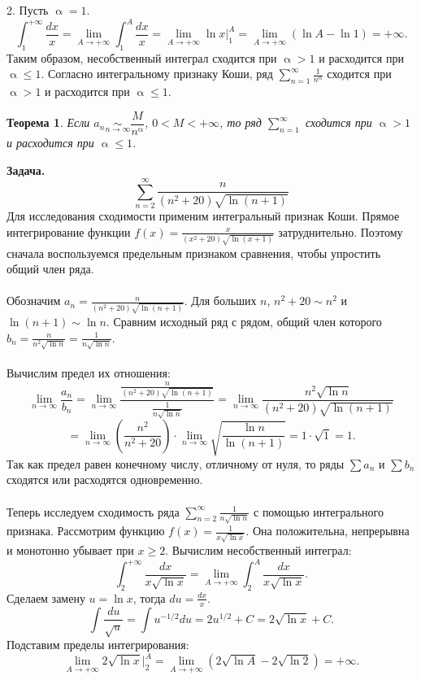 \documentclass[a4paper, 12pt]{report}
\numberwithin{equation}{section}
\renewcommand{\leq}{\leqslant}
\renewcommand{\alpha}{\upalpha}
\newcommand{\sumn}{\sum\limits_{n=1}^\infty}
\newtheorem*{theorem}{Теорема}
\begin{document}
	2. Пусть $\alpha = 1$.
	$$ \int_{1}^{+\infty} \frac{dx}{x} = \lim_{A \to +\infty} \int_{1}^{A} \frac{dx}{x} = \lim_{A \to +\infty} \ln x\Big|_{1}^{A} = \lim_{A \to +\infty} (\ln A - \ln 1) = +\infty. $$
	Таким образом, несобственный интеграл сходится при $\alpha > 1$ и расходится при $\alpha \le 1$.
	Согласно интегральному признаку Коши, ряд $\sum_{n=1}^{\infty} \frac{1}{n^\alpha}$ сходится при $\alpha > 1$ и расходится при $\alpha \le 1$.
	\begin{theorem}
		Если $a_n\underset{n\to\infty}{\sim}\dfrac{M}{n^\alpha}$, $0<M<+\infty$, то ряд $\sumn$ сходится при $\alpha > 1$ и расходится при $\alpha \leq 1$.
	\end{theorem}
	\noindent
	\textbf{Задача.}
	$$\sum_{n=2}^{\infty} \frac{n}{(n^2+20)\sqrt{\ln(n+1)}}$$
	Для исследования сходимости применим интегральный признак Коши. Прямое интегрирование функции $f(x) = \frac{x}{(x^2+20)\sqrt{\ln(x+1)}}$ затруднительно. Поэтому сначала воспользуемся предельным признаком сравнения, чтобы упростить общий член ряда.
	\\\\
	Обозначим $a_n = \frac{n}{(n^2+20)\sqrt{\ln(n+1)}}$.
	Для больших $n$, $n^2+20 \sim n^2$ и $\ln(n+1) \sim \ln n$. Сравним исходный ряд с рядом, общий член которого $b_n = \frac{n}{n^2\sqrt{\ln n}} = \frac{1}{n\sqrt{\ln n}}$.
	\\\\
	Вычислим предел их отношения:
	$$ \lim_{n \to \infty} \frac{a_n}{b_n} = \lim_{n \to \infty} \frac{\frac{n}{(n^2+20)\sqrt{\ln(n+1)}}}{\frac{1}{n\sqrt{\ln n}}} = \lim_{n \to \infty} \frac{n^2 \sqrt{\ln n}}{(n^2+20)\sqrt{\ln(n+1)}} $$
	$$ = \lim_{n \to \infty} \left(\frac{n^2}{n^2+20}\right) \cdot \lim_{n \to \infty} \sqrt{\frac{\ln n}{\ln(n+1)}} = 1 \cdot \sqrt{1} = 1. $$
	Так как предел равен конечному числу, отличному от нуля, то ряды $\sum a_n$ и $\sum b_n$ сходятся или расходятся одновременно.
	\\\\
	Теперь исследуем сходимость ряда $\sum_{n=2}^{\infty} \frac{1}{n\sqrt{\ln n}}$ с помощью интегрального признака.
	Рассмотрим функцию $f(x) = \frac{1}{x\sqrt{\ln x}}$. Она положительна, непрерывна и монотонно убывает при $x \ge 2$. Вычислим несобственный интеграл:
	$$ \int_{2}^{+\infty} \frac{dx}{x\sqrt{\ln x}} = \lim_{A \to +\infty} \int_{2}^{A} \frac{dx}{x\sqrt{\ln x}}. $$
	Сделаем замену $u = \ln x$, тогда $du = \frac{dx}{x}$.
	$$ \int \frac{du}{\sqrt{u}} = \int u^{-1/2} du = 2u^{1/2} + C = 2\sqrt{\ln x} + C. $$
	Подставим пределы интегрирования:
	$$ \lim_{A \to +\infty} 2\sqrt{\ln x}\Big|_{2}^{A} = \lim_{A \to +\infty} (2\sqrt{\ln A} - 2\sqrt{\ln 2}) = +\infty. $$
\end{document}
